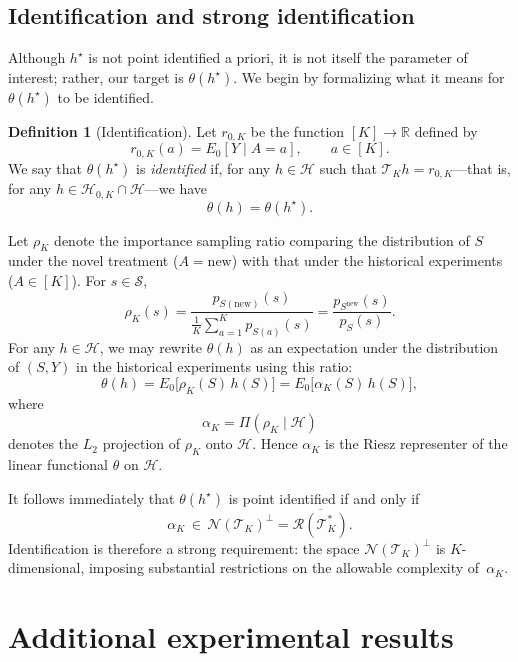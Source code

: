 \documentclass[11pt]{article}
\newcommand{\new}{\mathrm{new}}
\theoremstyle{plain}
\theoremstyle{definition}
\newtheorem{definition}{Definition}
\theoremstyle{remark}
\theoremstyle{definition}
\begin{document}
\subsection{Identification and strong identification}

Although $h^\star$ is not point identified a priori, it is not itself the parameter of interest; rather, our target is $\theta(h^\star)$. We begin by formalizing what it means for $\theta(h^\star)$ to be identified.

\begin{definition}[Identification]
Let $r_{0,K}$ be the function $[K]\to\mathbb{R}$ defined by
\[
r_{0,K}(a) = E_0[Y \mid A=a], \qquad a\in[K].
\]
We say that $\theta(h^\star)$ is \emph{identified} if, for any $h \in \mathcal{H}$ such that $\mathcal{T}_K h = r_{0,K}$---that is, for any $h \in \mathcal{H}_{0,K}\cap\mathcal{H}$---we have
\[
\theta(h) = \theta(h^\star).
\]
\end{definition}

Let $\rho_K$ denote the importance sampling ratio comparing the distribution of $S$ under the novel treatment ($A=\new$) with that under the historical experiments ($A\in[K]$). For $s\in\mathcal{S}$,
\[
\rho_K(s)
= \frac{p_{S(\new)}(s)}{\frac{1}{K}\sum_{a=1}^K p_{S(a)}(s)}
= \frac{p_{S^{\new}}(s)}{p_S(s)}.
\]
For any $h\in\mathcal{H}$, we may rewrite $\theta(h)$ as an expectation under the distribution of $(S,Y)$ in the historical experiments using this ratio:
\[
\theta(h)
= E_0\!\big[\rho_K(S)\, h(S)\big]
= E_0\!\big[\alpha_K(S)\, h(S)\big],
\]
where
\[
\alpha_K = \Pi\!\left(\rho_K \mid \mathcal{H}\right)
\]
denotes the $L_2$ projection of $\rho_K$ onto $\mathcal{H}$. Hence $\alpha_K$ is the Riesz representer of the linear functional $\theta$ on $\mathcal{H}$.

It follows immediately that $\theta(h^\star)$ is point identified if and only if
\[
\alpha_K \,\in\, \mathcal{N}(\mathcal{T}_K)^\perp
= \overline{\mathcal{R}(\mathcal{T}_K^*)}.
\]
Identification is therefore a strong requirement: the space $\mathcal{N}(\mathcal{T}_K)^\perp$ is $K$-dimensional, imposing substantial restrictions on the allowable complexity of~$\alpha_K$.



 \section{Additional experimental results}
\end{document}
